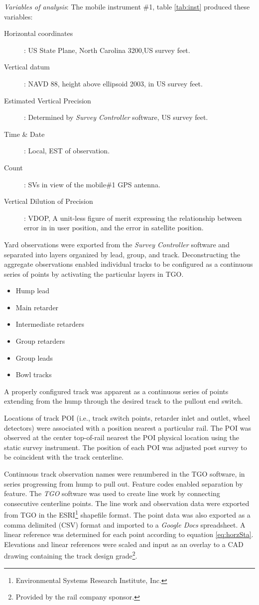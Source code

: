 \emph{Variables of analysis}: The mobile instrument \#1, table \ref{tab:inst} produced these variables:
\begin{description}	
	\item [Horizontal coordinates]: US State Plane, North Carolina 3200,US survey feet.
	\item [Vertical datum]: NAVD 88, height above ellipsoid 2003, in US survey feet.
	\item [Estimated Vertical Precision]: Determined by \emph{Survey Controller} software, US survey feet.
	\item [Time \& Date]: Local, EST of observation.
	\item [Count]: SVs in view of the mobile\#1 GPS antenna.
	\item [Vertical Dilution of Precision]: VDOP, A unit-less figure of merit expressing the relationship between error in in user position, and the error in satellite position.
\end{description}

Yard observations were exported from the \emph{Survey Controller} software and separated into layers organized by lead, group, and track. Deconstructing the aggregate observations enabled individual tracks to be configured as a continuous series of points by activating the particular layers in TGO.

\begin{itemize}
	\item Hump lead
	\item Main retarder
	\item Intermediate retarders
	\item Group retarders
	\item Group leads
	\item Bowl tracks
\end{itemize}

A properly configured track was apparent as a continuous series of points extending from the hump through the desired track to the pullout end switch.

Locations of track POI (i.e., track switch points, retarder inlet and outlet, wheel detectors) were associated with a position nearest a particular rail. The POI was observed at the center top-of-rail nearest the POI physical location using the static survey instrument. The position of each POI was adjusted post survey to be coincident with the track centerline.

Continuous track observation names were renumbered in the TGO software, in series progressing from hump to pull out. Feature codes enabled separation by feature. The \emph{TGO} software was used to create line work by connecting consecutive centerline points. The line work and observation data were exported from TGO in the ESRI\footnote{Environmental Systems Research Institute, Inc.} shapefile format. The point data was also exported as a comma delimited (CSV) format and imported to a \emph{Google Docs} spreadsheet. A linear reference was determined for each point according to equation \ref{eq:horzSta}. Elevations and linear references were scaled and input as an overlay to a CAD drawing containing the track design grade\footnote{Provided by the rail company sponsor.}. 

